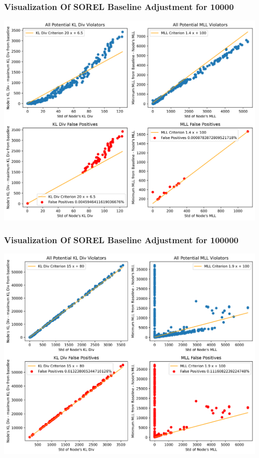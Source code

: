 \documentclass{beamer}
\begin{document}
\begin{frame}
    \frametitle{Visualization Of SOREL Baseline Adjustment for 10000}
    \begin{center}
        \includegraphics[scale=0.4]{10000_violators.png}
    \end{center}
\end{frame}

\begin{frame}
    \frametitle{Visualization Of SOREL Baseline Adjustment for 100000}
    \begin{center}
        \includegraphics[scale=0.4]{100000_violators.png}
    \end{center}
\end{frame}
\end{document}
